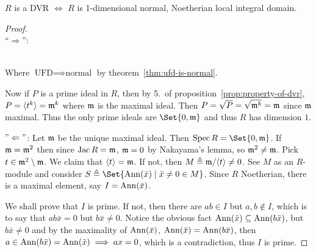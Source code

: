 \begin{prop} \label{dvr-equiv-condition}
  $R$ is a DVR $\iff$ $R$ is 1-dimensional normal, Noetherian local integral domain.
  \begin{proof} \hfill \\
    ``$\Rightarrow$'':
     \\
    Where $\text{UFD} \implies \text{normal}$ by theorem~\ref{thm:ufd-is-normal}.

    Now if $P$ is a prime ideal in $R$, then by 5.\ of proposition~\ref{prop:property-of-dvr},
    $P = \langle t^k\rangle = \mathfrak{m}^k$ where $\mathfrak{m}$ is the maximal ideal.
    Then $P = \sqrt{P} = \sqrt{\mathfrak{m}^k} = \mathfrak{m}$ since $\mathfrak{m}$ maximal. Thus the only
    prime ideals are $\Set{0, \mf}$ and thus $R$ has dimension $1$.

    $"\Leftarrow"$: Let $\mathfrak{m}$ be the unique maximal ideal.
    Then $\Spec R = \Set{0, \mf}$.
    If $\mathfrak{m} = \mathfrak{m}^2$ then since $\operatorname{Jac} R = \mathfrak{m}$, $\mathfrak{m} = 0$ by Nakayama's lemma,
    so $\mathfrak{m}^2 \neq \mathfrak{m}$. Pick $t \in \mathfrak{m}^2 \setminus \mathfrak{m}$.
    We claim that $\langle t\rangle = \mathfrak{m}$. If not, then $M \triangleq \mathfrak{m} / \langle t\rangle \neq 0$.
    See $M$ as an $R$-module and consider $S \triangleq \Set{ \Ann(\bar{x}) \mid \bar{x} \neq 0 \in M }$.
    Since $R$ Noetherian, there is a maximal element, say $I = \operatorname{Ann}(\bar{x})$.

    We shall prove that $I$ is prime. If not, then there are $ab \in I$
    but $a, b \not\in I$, which is to say that $ab\bar{x} = 0$ but $b \bar{x} \neq 0$.
    Notice the obvious fact $\operatorname{Ann}(\bar{x}) \subseteq \operatorname{Ann}(b\bar{x})$,
    but $b \bar{x} \ne 0$ and by the maximality of $\operatorname{Ann}(\bar{x})$,
    $\operatorname{Ann}(\bar{x}) = \operatorname{Ann}(b\bar{x})$, then $a \in \operatorname{Ann}(b\bar{x}) = \operatorname{Ann}(\bar{x})
    \implies ax = 0$, which is a contradiction, thus $I$ is prime.


\end{proof}
\end{prop}

